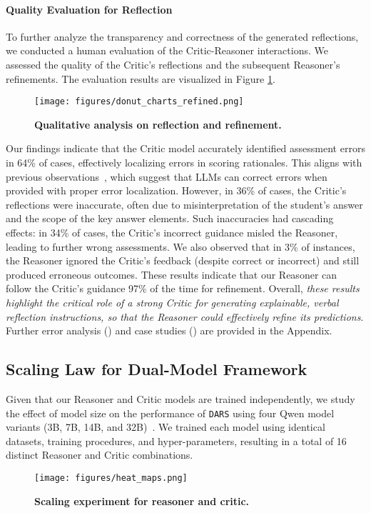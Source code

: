 \paragraph{Quality Evaluation for Reflection}
To further analyze the transparency and correctness of the generated reflections, we conducted a human evaluation of the Critic-Reasoner interactions. We assessed the quality of the Critic's reflections and the subsequent Reasoner's refinements. The evaluation results are visualized in Figure \ref{fig:human_evaluation}. %
\begin{figure}[ht]
\centering
\texttt{[image: figures/donut\_charts\_refined.png]}
\caption{\textbf{Qualitative analysis on reflection and refinement.}}
\label{fig:human_evaluation}
\vspace{-3mm}
\end{figure}

Our findings indicate that the Critic model accurately identified assessment errors in 64\% of cases, effectively localizing errors in scoring rationales. This aligns with previous observations~\cite{tyen-etal-2024-llms}, which suggest that LLMs can correct errors when provided with proper error localization. However, in 36\% of cases, the Critic's reflections were inaccurate, often due to misinterpretation of the student's answer and the scope of the key answer elements. Such inaccuracies had cascading effects: in 34\% of cases, the Critic's incorrect guidance misled the Reasoner, leading to further wrong assessments. We also observed that in 3\% of instances, the Reasoner ignored the Critic's feedback (despite correct or incorrect) %
and still produced erroneous outcomes.%
These results indicate that our Reasoner can follow the Critic's guidance 97\% of the time for refinement. Overall, \emph{these results highlight the critical role of a strong Critic for generating explainable, verbal reflection instructions, so that the Reasoner could effectively refine its predictions}. Further error analysis (\textsection{\ref{sec:our_detail_error_analysis}}) and case studies (\textsection{\ref{sec:our_case_study}}) are provided in the
Appendix.

\subsection{Scaling Law for Dual-Model Framework} \label{sec:scaling_law}
Given that our Reasoner and Critic models are trained independently, we study the effect of model size on the performance of \texttt{DARS} using four Qwen model variants (3B, 7B, 14B, and 32B)~\cite{qwen2.5}. We trained each model using identical datasets, training procedures, and hyper-parameters, resulting in a total of 16 distinct Reasoner and Critic combinations.
\begin{figure}[!ht]
\centering
\texttt{[image: figures/heat\_maps.png]} %
\caption{\small \textbf{Scaling experiment for reasoner and critic.}}
\label{fig:scaling_law}
\vspace{-4mm}
\end{figure}

